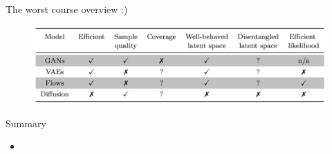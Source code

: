 \begin{frame}{The worst course overview :)}
	\begin{figure}
		\includegraphics[width=\linewidth]{figs/gen_comp_table}
	\end{figure}
\end{frame}
\begin{frame}{Summary}
	\begin{itemize}
		\item 
	\end{itemize}
\end{frame}
 